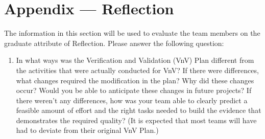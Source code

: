 \documentclass[12pt, titlepage]{article}
\begin{document}
\newpage{}
\section*{Appendix --- Reflection}

The information in this section will be used to evaluate the team members on the
graduate attribute of Reflection.  Please answer the following question:

\begin{enumerate}
  \item In what ways was the Verification and Validation (VnV) Plan different
  from the activities that were actually conducted for VnV?  If there were
  differences, what changes required the modification in the plan?  Why did
  these changes occur?  Would you be able to anticipate these changes in future
  projects?  If there weren't any differences, how was your team able to clearly
  predict a feasible amount of effort and the right tasks needed to build the
  evidence that demonstrates the required quality?  (It is expected that most
  teams will have had to deviate from their original VnV Plan.)
\end{enumerate}

\newpage{}
\end{document}

